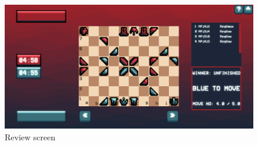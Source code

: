 \documentclass[../main/main.tex]{subfiles}
\begin{document}
\begin{figure}[H]
    \centering
    \includegraphics[width=\columnwidth]{../screenshots/assets/review.png}
    \caption{Review screen}
    \label{fig:screenshots-review}
\end{figure}
\end{document}
